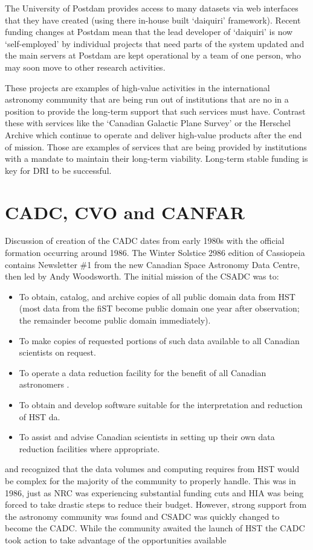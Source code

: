 \documentclass[11pt]{article}
\begin{document}
The University of Postdam provides access to many datasets via web interfaces that they have created (using there in-house built `daiquiri' framework).  Recent funding changes at Postdam mean that the lead developer of `daiquiri' is now `self-employed' by individual projects that need parts of the system updated and the main servers at Postdam are kept operational by a team of one person, who may soon move to other research activities.  

These projects are examples of high-value activities in the international astronomy community that are being run out of institutions that are no in a position to provide the long-term support that such services must have.  
Contrast these with services like the `Canadian Galactic Plane Survey' or the Herschel Archive which continue to operate and deliver high-value products after the end of mission.  Those are examples of services that are being provided by institutions with a mandate to maintain their long-term viability. 
Long-term stable funding is key for DRI to be successful.


\section{CADC, CVO and CANFAR}

Discussion of creation of the CADC dates from early 1980s with the official formation occurring around 1986.  The Winter Solstice 2986 edition of Cassiopeia contains Newsletter \#1 from the new Canadian Space Astronomy Data Centre, then led by Andy Woodsworth.  The initial mission of the CSADC was to:
\begin{itemize}
\item To obtain, catalog, and archive copies of all public domain data from HST (most data from the fiST become public domain one year after observation; the remainder become public domain immediately).
\item To make copies of requested portions of such data available to all Canadian scientists on request.
\item To operate a data reduction facility for the benefit of all Canadian astronomers .
\item To obtain and develop software suitable for the interpretation and reduction of HST
da.
\item  To assist and advise Canadian scientists in setting up their own data reduction facilities where appropriate.
\end{itemize}
and recognized that the data volumes and computing requires from HST would be complex for the majority of the community to properly handle.  This was in 1986, just as NRC was experiencing substantial funding cuts and HIA was being forced to take drastic steps to reduce their budget.  However, strong support from the astronomy community was found and CSADC was quickly changed to become the CADC.  While the community awaited the launch of HST the CADC took action to take advantage of the opportunities available 
\end{document}
